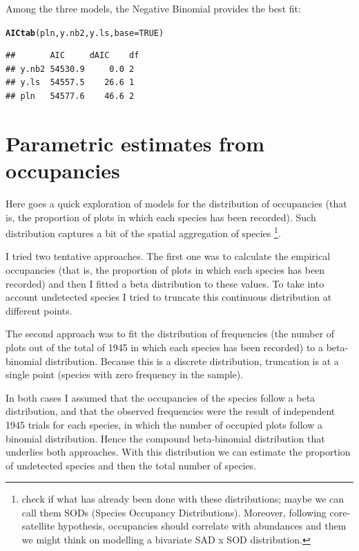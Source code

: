 \documentclass[12pt, A4]{article}\usepackage[]{graphicx}\usepackage[]{color}
\makeatletter
\newcommand{\hlnum}[1]{\textcolor[rgb]{0.686,0.059,0.569}{#1}}%
\newcommand{\hlstd}[1]{\textcolor[rgb]{0.345,0.345,0.345}{#1}}%
\newcommand{\hlkwc}[1]{\textcolor[rgb]{0.333,0.667,0.333}{#1}}%
\newcommand{\hlkwd}[1]{\textcolor[rgb]{0.737,0.353,0.396}{\textbf{#1}}}%
\newenvironment{kframe}{%
 \def\at@end@of@kframe{}%
 \ifinner\ifhmode%
  \def\at@end@of@kframe{\end{minipage}}%
  \begin{minipage}{\columnwidth}%
 \fi\fi%
 \def\FrameCommand##1{\hskip\@totalleftmargin \hskip-\fboxsep
 \colorbox{shadecolor}{##1}\hskip-\fboxsep
     \hskip-\linewidth \hskip-\@totalleftmargin \hskip\columnwidth}%
 \MakeFramed {\advance\hsize-\width
   \@totalleftmargin\z@ \linewidth\hsize
   \@setminipage}}%
 {\par\unskip\endMakeFramed%
 \at@end@of@kframe}
\newenvironment{knitrout}{}{} %
\makeatother
\begin{document}
Among the three models, the Negative Binomial
provides the best fit:

 
\begin{knitrout}
\color{fgcolor}\begin{kframe}
\begin{alltt}
\hlkwd{AICtab}\hlstd{(pln, y.nb2, y.ls,} \hlkwc{base}\hlstd{=}\hlnum{TRUE}\hlstd{)}
\end{alltt}
\begin{verbatim}
##       AIC     dAIC    df
## y.nb2 54530.9     0.0 2 
## y.ls  54557.5    26.6 1 
## pln   54577.6    46.6 2
\end{verbatim}
\end{kframe}
\end{knitrout}

\section*{Parametric estimates from occupancies}

Here goes a quick exploration of models for the distribution of
occupancies (that is, the proportion of plots in which each species
has been recorded). Such distribution captures a bit of
the spatial aggregation of species \footnote{check if what has already been done with these distributions; maybe we can call them SODs (Species Occupancy Distributions). Moreover, following core-satellite hypothesis, occupancies should correlate with abundances and them we might think on modelling a bivariate SAD x SOD distribution.}. 

I tried two tentative approaches.
The first one was to calculate the empirical occupancies (that is, the proportion
of plots in which each species has been recorded) and then I fitted
a beta distribution to these values. 
To take into account undetected species I tried to truncate this
continuous distribution at different points.

The second approach was to fit the distribution
of frequencies (the number of plots out of the total of 1945
in which each species has been recorded) to
a beta-binomial distribution. Because this is a discrete distribution, 
truncation is at a single point (species with zero frequency in the sample).

In both cases I assumed that the occupancies of the species
follow a beta distribution, and that the observed frequencies were
the result of independent 1945 trials for each species, in which
the number of occupied plots follow a binomial distribution. 
Hence the compound beta-binomial distribution that underlies both approaches.
With this distribution we can estimate the proportion of undetected species
and then the total number of species.
\end{document}
